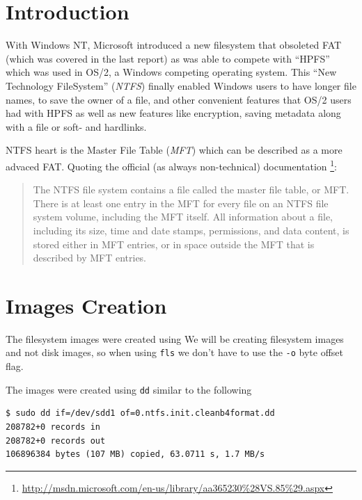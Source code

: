 \documentclass[a4paper,
    11pt,
    normalheadings,
    parindent,
    UKenglish,
    abstracton,
    ]{scrartcl}
\title{\mytitle{}}
\author{
    cand. Dipl. Inf. Tobias Müller <\href{mailto:muellet2@computing.dcu.ie?subject=ss10-forensic-lab01}{muellet2@}>, 59212333 \and
    BSc. Anthony Walters <\href{mailto:waltera3@computing.dcu.ie?subject=ss10-forensic-lab01}{waltera3@}>, 59213102
    }
\date{\today}
\begin{document}
\maketitle


\section{Introduction}
With Windows NT, Microsoft introduced a new filesystem that obsoleted FAT (which was covered in the last report) as was able to compete with ``HPFS'' which was used in OS/2, a Windows competing operating system.
This ``New Technology FileSystem'' (\emph{NTFS}) finally enabled Windows users to have longer file names, to save the owner of a file, and other convenient features that OS/2 users had with HPFS as well as new features like encryption, saving metadata along with a file or soft- and hardlinks.


NTFS heart is the Master File Table (\emph{MFT}) which can be described as a more advaced FAT.
Quoting the official (as always non-technical) documentation%
\footnote{\url{http://msdn.microsoft.com/en-us/library/aa365230\%28VS.85\%29.aspx}}:
\begin{quote}
The NTFS file system contains a file called the master file table, or MFT. There is at least one entry in the MFT for every file on an NTFS file system volume, including the MFT itself. All information about a file, including its size, time and date stamps, permissions, and data content, is stored either in MFT entries, or in space outside the MFT that is described by MFT entries.
\end{quote}


\section{Images Creation}
The filesystem images were created using
We will be creating filesystem images and not disk images, so when using \texttt{fls} we don't have to use the \texttt{-o} byte offset flag.

The images were created using \texttt{dd} similar to the following
\begin{verbatim}
$ sudo dd if=/dev/sdd1 of=0.ntfs.init.cleanb4format.dd
208782+0 records in
208782+0 records out
106896384 bytes (107 MB) copied, 63.0711 s, 1.7 MB/s
\end{verbatim}
\end{document}
